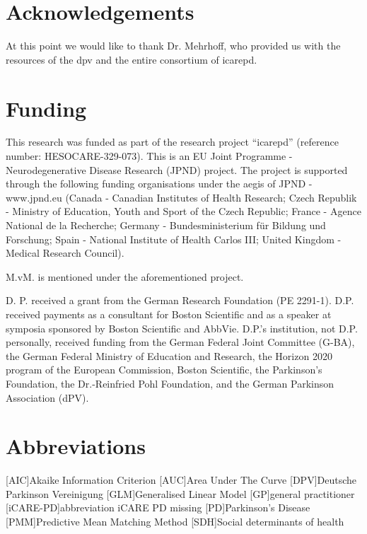 \documentclass{bmcart}
\begin{document}
\begin{backmatter}

\section*{Acknowledgements}
At this point we would like to thank Dr. Mehrhoff, who provided us with the resources of the \ac{dpv} and the entire consortium of \ac{icarepd}.

\section*{Funding}%
This research was funded as part of the research project ``\ac{icarepd}'' (reference number: HESOCARE-329-073). This is an EU Joint Programme - Neurodegenerative Disease Research (JPND) project. The project is supported through the following funding organisations under the aegis of JPND - www.jpnd.eu (Canada - Canadian Institutes of Health Research; Czech Republik - Ministry of Education, Youth and Sport of the Czech Republic; France - Agence National de la Recherche; Germany - Bundesministerium für Bildung und Forschung; Spain - National Institute of Health Carlos III; United Kingdom - Medical Research Council). \newline

M.vM. is mentioned under the aforementioned project. \newline

D. P. received a grant from the German Research Foundation (PE 2291-1). D.P. received payments as a consultant for Boston Scientific and as a speaker at symposia sponsored by Boston Scientific and AbbVie. D.P.'s institution, not D.P. personally, received funding from the German Federal Joint Committee (G-BA), the German Federal Ministry of Education and Research, the Horizon 2020 program of the European Commission, Boston Scientific, the Parkinson’s Foundation, the Dr.-Reinfried Pohl Foundation, and the German Parkinson Association (dPV).

\section*{Abbreviations}
\begin{acronym}[ECU]
[AIC]{Akaike Information Criterion}
[AUC]{Area Under The Curve}
[DPV]{Deutsche Parkinson Vereinigung}
[GLM]{Generalised Linear Model}
[GP]{general practitioner}
[iCARE-PD]{abbreviation iCARE PD missing}
[PD]{Parkinson's Disease}
[PMM]{Predictive Mean Matching Method}
[SDH]{Social determinants of health}
\end{acronym}



\end{backmatter}
\end{document}
